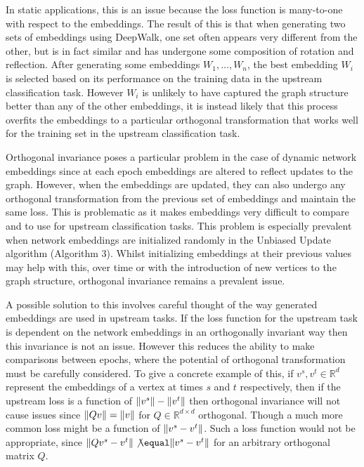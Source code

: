\documentclass[a4paper]{article}
\begin{document}
In static applications, this is an issue because the loss function is many-to-one with respect to the embeddings. The result of this is that when generating two sets of 
embeddings using DeepWalk, one set often appears very different from the other, but is in fact similar and has undergone some composition of rotation and reflection. After generating 
some embeddings $W_1, \dots, W_n$, the best embedding $W_i$ is selected based on its performance on the training data in the upstream classification task. However $W_i$ is unlikely to have captured the graph structure
better than any of the other embeddings, it is instead likely that this process overfits the embeddings to a particular orthogonal transformation that works well for the training set in the upstream classification task.

Orthogonal invariance poses a particular problem in the case of dynamic network embeddings since at each epoch embeddings are altered to reflect
updates to the graph. However, when the embeddings are updated, they can also undergo any orthogonal transformation from the previous set of embeddings
and maintain the same loss. This is problematic as it makes embeddings very difficult to compare and to use for upstream classification tasks. This problem is especially
prevalent when network embeddings are initialized randomly in the Unbiased Update algorithm (Algorithm 3). Whilst initializing embeddings at their previous values may help with this,
over time or with the introduction of new vertices to the graph structure, orthogonal invariance remains a prevalent issue.

A possible solution to this involves careful thought of the way generated embeddings are used in upstream tasks. If the loss function for the upstream task
is dependent on the network embeddings in an orthogonally invariant way then this invariance is not an issue. However this reduces the ability to
make comparisons between epochs, where the potential of orthogonal transformation must be carefully considered.
To give a concrete example of this,  if $v^s, v^t \in \mathbb{R}^d$ represent the embeddings of a vertex at times $s$ and $t$ respectively, then
if the upstream loss is a function of $\lVert v^s\rVert-\lVert v^t\rVert$ then orthogonal invariance will not cause issues since $\lVert Qv\rVert = \lVert v\rVert$ for $Q \in \mathbb{R}^{d \times d}$ orthogonal.
Though a much more common loss might be a function of $\lVert v^s - v^t\rVert$. Such a loss function would not be appropriate, since $\norm{Qv^s - v^t} \not\equal \norm{v^s - v^t}$ for an arbitrary
orthogonal matrix $Q$.
\end{document}
